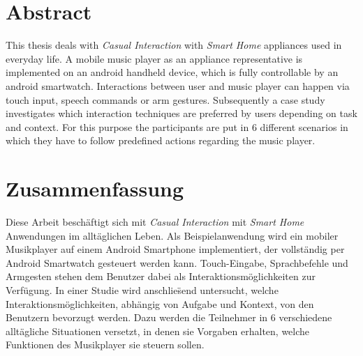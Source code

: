 \begingroup
\let\clearpage\relax
\let\cleardoublepage\relax
\let\cleardoublepage\relax

\chapter*{Abstract}
This thesis deals with \textit{Casual Interaction} with \textit{Smart Home} appliances used in everyday life. A mobile music player as an appliance representative is implemented on an android handheld device, which is fully controllable by an android smartwatch. Interactions between user and music player can happen via touch input, speech commands or arm gestures. Subsequently a case study investigates which interaction techniques are preferred by users depending on task and context. For this purpose the participants are put in 6 different scenarios in which they have to follow predefined actions regarding the music player.


\vfill

\chapter*{Zusammenfassung}
Diese Arbeit besch\"aftigt sich mit \textit{Casual Interaction} mit \textit{Smart Home} Anwendungen im allt\"aglichen Leben. Als Beispielanwendung wird ein mobiler Musikplayer auf einem Android Smartphone implementiert, der vollst\"andig per Android Smartwatch gesteuert werden kann. Touch-Eingabe, Sprachbefehle und Armgesten stehen dem Benutzer dabei als Interaktionsm\"oglichkeiten zur Verf\"ugung. In einer Studie wird anschlie\"send untersucht, welche Interaktionsm\"oglichkeiten, abh\"angig von Aufgabe und Kontext, von den Benutzern bevorzugt werden. Dazu werden die Teilnehmer in 6 verschiedene allt\"agliche Situationen versetzt, in denen sie Vorgaben erhalten, welche Funktionen des Musikplayer sie steuern sollen.


\endgroup			

\vfill